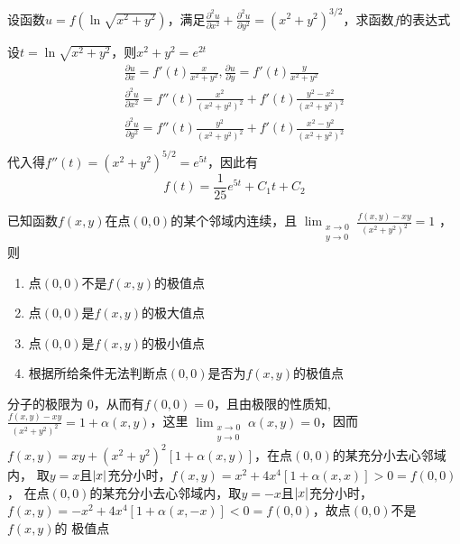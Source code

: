 \documentclass{article}
\begin{document}
\begin{examplle}[]
设函数\(u=f(\ln\sqrt{x^2+y^2})\)，满足\(\frac{\partial^2u}{\partial x^2}+\frac{\partial^2u}{\partial
   y^2}=(x^2+y^2)^{3/2}\)，求函数\(f\)的表达式

设\(t=\ln\sqrt{x^2+y^2}\)，则\(x^2+y^2=e^{2t}\)
\begin{gather*}
\frac{\partial u}{\partial x}=f'(t)\frac{x}{x^2+y^2},\frac{\partial u}{\partial y}=f'(t)\frac{y}{x^2+y^2}\\
\frac{\partial^2 u}{\partial x^2}=f''(t)\frac{x^2}{(x^2+y^2)^2}+f'(t)\frac{y^2-x^2}{(x^2+y^2)^2}\\
\frac{\partial^2 u}{\partial y^2}=f''(t)\frac{y^2}{(x^2+y^2)^2}+f'(t)\frac{x^2-y^2}{(x^2+y^2)^2}\\
\end{gather*}
代入得\(f''(t)=(x^2+y^2)^{5/2}=e^{5t}\)，因此有
\begin{equation*}
f(t)=\frac{1}{25}e^{5t}+C_1t+C_2
\end{equation*}
\end{examplle}

\begin{examplle}[]
已知函数\(f(x,y)\)在点\((0,0)\)的某个邻域内连续，且
\(\displaystyle\lim_{\substack{x\to0\\y\to0}}\frac{f(x,y)-xy}{(x^2+y^2)^2}=1\)
，则
\begin{enumerate}
\item 点\((0,0)\)不是\(f(x,y)\)的极值点
\item 点\((0,0)\)是\(f(x,y)\)的极大值点
\item 点\((0,0)\)是\(f(x,y)\)的极小值点
\item 根据所给条件无法判断点\((0,0)\)是否为\(f(x,y)\)的极值点
\end{enumerate}


分子的极限为 0，从而有\(f(0,0)=0\)，且由极限的性质知,
\(\frac{f(x,y)-xy}{(x^2+y^2)^2}=1+\alpha(x,y)\)，这里
\(\displaystyle\lim_{\substack{x\to0\\y\to0}}\alpha(x,y)=0\)，因而
\(f(x,y)=xy+(x^2+y^2)^2[1+\alpha(x,y)]\)，在点\((0,0)\)的某充分小去心邻域内，
取\(y=x\)且\(\abs{x}\)充分小时，\(f(x,y)=x^2+4x^4[1+\alpha(x,x)]>0=f(0,0)\)，
在点\((0,0)\)的某充分小去心邻域内，取\(y=-x\)且\(\abs{x}\)充分小时，
\(f(x,y)=-x^2+4x^4[1+\alpha(x,-x)]<0=f(0,0)\)，故点\((0,0)\)不是\(f(x,y)\)的
极值点
\end{examplle}
\end{document}
